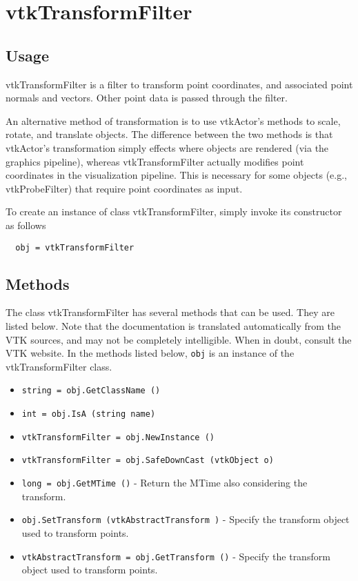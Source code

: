 \section{vtkTransformFilter}

\subsection{Usage}

 vtkTransformFilter is a filter to transform point coordinates, and 
 associated point normals and vectors. Other point data is passed
 through the filter.

 An alternative method of transformation is to use vtkActor's methods
 to scale, rotate, and translate objects. The difference between the
 two methods is that vtkActor's transformation simply effects where
 objects are rendered (via the graphics pipeline), whereas
 vtkTransformFilter actually modifies point coordinates in the 
 visualization pipeline. This is necessary for some objects 
 (e.g., vtkProbeFilter) that require point coordinates as input.

To create an instance of class vtkTransformFilter, simply
invoke its constructor as follows
\begin{verbatim}
  obj = vtkTransformFilter
\end{verbatim}
\subsection{Methods}

The class vtkTransformFilter has several methods that can be used.
  They are listed below.
Note that the documentation is translated automatically from the VTK sources,
and may not be completely intelligible.  When in doubt, consult the VTK website.
In the methods listed below, \verb|obj| is an instance of the vtkTransformFilter class.
\begin{itemize}
\item  \verb|string = obj.GetClassName ()|

\item  \verb|int = obj.IsA (string name)|

\item  \verb|vtkTransformFilter = obj.NewInstance ()|

\item  \verb|vtkTransformFilter = obj.SafeDownCast (vtkObject o)|

\item  \verb|long = obj.GetMTime ()| -  Return the MTime also considering the transform.

\item  \verb|obj.SetTransform (vtkAbstractTransform )| -  Specify the transform object used to transform points.

\item  \verb|vtkAbstractTransform = obj.GetTransform ()| -  Specify the transform object used to transform points.

\end{itemize}
